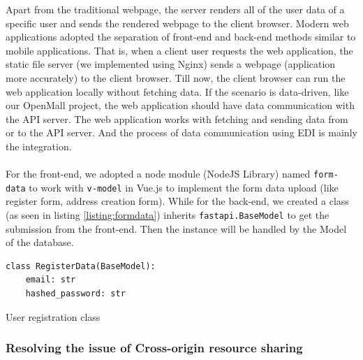 \documentclass{article}
\begin{document}
Apart from the traditional webpage, the server renders all of the user data of a specific user and sends the rendered webpage to the client browser. Modern web applications adopted the separation of front-end and back-end methods similar to mobile applications. That is, when a client user requests the web application, the static file server (we implemented using Nginx) sends a webpage (application more accurately) to the client browser. Till now, the client browser can run the web application locally without fetching data. If the scenario is data-driven, like our OpenMall project, the web application should have data communication with the API server. The web application works with fetching and sending data from or to the API server. And the process of data communication using EDI is mainly the integration.
\\\\
For the front-end, we adopted a node module (NodeJS Library) named \verb|form-data| to work with \verb|v-model| in Vue.js to implement the form data upload (like register form, address creation form). While for the back-end, we created a class (as seen in listing \ref{listing:formdata}) inherits \verb|fastapi.BaseModel| to get the submission from the front-end. Then the instance will be handled by the Model of the database.

\begin{listing}[!htp]
\begin{verbatim}
class RegisterData(BaseModel):
    email: str
    hashed_password: str
\end{verbatim}
\caption{User registration class}
\label{listing:formdata}
\end{listing}

\subsubsection{Resolving the issue of Cross-origin resource sharing}
\end{document}
